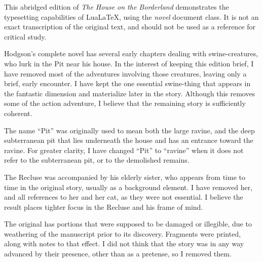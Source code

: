 \documentclass{novel} %
\begin{document}
\thispagestyle{empty} %
\label{ch:foreword}
\begin{ChapterStart}
\null\null
{}
\end{ChapterStart}
This abridged edition of \textit{The House on the Borderland} demonstrates the typesetting capabilities of LuaLaTeX, using the \textit{novel} document class. It is not an exact transcription of the original text, and should not be used as a reference for critical study.\par
Hodgson’s complete novel has several early chapters dealing with swine-creatures, who lurk in the Pit near his house. In the interest of keeping this edition brief, I have removed most of the adventures involving those creatures, leaving only a brief, early encounter. I have kept the one essential swine-thing that appears in the fantastic dimension and materialize later in the story. Although this removes some of the action adventure, I believe that the remaining story is sufficiently coherent.\par
The name “Pit” was originally used to mean both the large ravine, and the deep subterranean pit that lies underneath the house and has an entrance toward the ravine. For greater clarity, I have changed “Pit” to “ravine” when it does not refer to the subterranean pit, or to the demolished remains.\par
The Recluse was accompanied by his elderly sister, who appears from time to time in the original story, usually as a background element. I have removed her, and all references to her and her cat, as they were not essential. I believe the result places tighter focus in the Recluse and his frame of mind.\par
The original has portions that were supposed to be damaged or illegible, due to weathering of the manuscript prior to its discovery. Fragments were printed, along with notes to that effect. I did not think that the story was in any way advanced by their presence, other than as a pretense, so I removed them.\par
\end{document}
